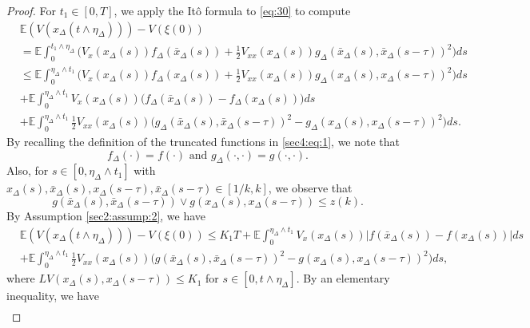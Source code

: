 \documentclass[11pt]{article}
\begin{document}
\begin{proof}
For $t_1\in[0,T]$, we apply the It\^{o} formula to \eqref{eq:30} to compute
\begin{align*}
&\mathbb{E}(V(x_{\Delta}(t\wedge \eta_{\Delta})))-V(\xi(0))\\
&=\mathbb{E}\int_{0}^{t_1\wedge \eta_{\Delta}}\Big(V_x(x_{\Delta}(s))f_{\Delta}(\bar{x}_{\Delta}(s))+\frac{1}{2}V_{xx}(x_{\Delta}(s))g_{\Delta}(\bar{x}_{\Delta}(s),\bar{x}_{\Delta}(s-\tau))^2\Big)ds\\
&\le\mathbb{E}\int_{0}^{\eta_{\Delta}\wedge t_1}\Big(V_x(x_{\Delta}(s))f_{\Delta}(x_{\Delta}(s))+\frac{1}{2}V_{xx}(x_{\Delta}(s))g_{\Delta}(x_{\Delta}(s),x_{\Delta}(s-\tau))^2\Big)ds\\
&+\mathbb{E}\int_{0}^{\eta_{\Delta}\wedge t_1}V_x(x_{\Delta}(s))\Big(f_{\Delta}(\bar{x}_{\Delta}(s))-f_{\Delta}(x_{\Delta}(s))\Big)ds\\
&+\mathbb{E}\int_{0}^{\eta_{\Delta}\wedge t_1}\frac{1}{2}V_{xx}(x_{\Delta}(s))\Big(g_{\Delta}(\bar{x}_{\Delta}(s),\bar{x}_{\Delta}(s-\tau))^2-g_{\Delta}(x_{\Delta}(s),x_{\Delta}(s-\tau))^2\Big)ds.
\end{align*}
By recalling the definition of the truncated functions in \eqref{sec4:eq:1}, we note that
\begin{equation}\label{sec5:eq:recall0}
f_{\Delta}(\cdot)=f(\cdot)\text{ and } g_{\Delta}(\cdot,\cdot)=g(\cdot,\cdot).
\end{equation}
Also, for  $s\in[0,\eta_{\Delta}\wedge t_1]$ with $x_{\Delta}(s),\bar{x}_{\Delta}(s),x_{\Delta}(s-\tau),\bar{x}_{\Delta}(s-\tau)\in[1/k,k]$, we observe that
\begin{equation}\label{sec5:eq:recall1}
g(\bar{x}_{\Delta}(s),\bar{x}_{\Delta}(s-\tau))\vee g(x_{\Delta}(s),x_{\Delta}(s-\tau))\le z(k).
\end{equation}
By Assumption \ref{sec2:assump:2}, we have 
\begin{align*}
&\mathbb{E}(V(x_{\Delta}(t\wedge \eta_{\Delta})))-V(\xi(0))\le K_1T+\mathbb{E}\int_{0}^{\eta_{\Delta}\wedge t_1}V_x(x_{\Delta}(s))\vert f(\bar{x}_{\Delta}(s))-f(x_{\Delta}(s))\vert ds\\
&+\mathbb{E}\int_{0}^{\eta_{\Delta}\wedge t_1}\frac{1}{2}V_{xx}(x_{\Delta}(s))\Big(g(\bar{x}_{\Delta}(s),\bar{x}_{\Delta}(s-\tau))^2-g(x_{\Delta}(s),x_{\Delta}(s-\tau))^2\Big)ds,
\end{align*}
where $LV(x_{\Delta}(s),x_{\Delta}(s-\tau))\le K_1$ for $s\in[0,t\wedge \eta_{\Delta}]$. By  an elementary inequality, we have
\begin{align*}

\end{align*}
\end{proof}
\end{document}
